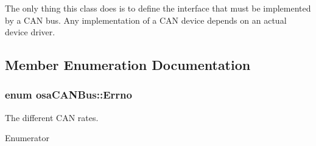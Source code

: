 The only thing this class does is to define the interface that must be implemented by a C\+A\+N bus. Any implementation of a C\+A\+N device depends on an actual device driver. 

\subsection{Member Enumeration Documentation}
\hypertarget{classosa_c_a_n_bus_a6fa3e95ec4c36932d0640e40e0748fde}{}
\subsubsection[{Errno}]{\setlength{\rightskip}{0pt plus 5cm}enum {\bf osa\+C\+A\+N\+Bus\+::\+Errno}}\label{classosa_c_a_n_bus_a6fa3e95ec4c36932d0640e40e0748fde}


The different C\+A\+N rates. 

\begin{Desc}
\item[Enumerator]\par
\begin{description}
\item[{\em 
\hypertarget{classosa_c_a_n_bus_a6fa3e95ec4c36932d0640e40e0748fdeaef10d7d2c42027e99e8b6662a516adef}{}E\+S\+U\+C\+C\+E\+S\+S\label{classosa_c_a_n_bus_a6fa3e95ec4c36932d0640e40e0748fdeaef10d7d2c42027e99e8b6662a516adef}
}]\item[{\em 
\hypertarget{classosa_c_a_n_bus_a6fa3e95ec4c36932d0640e40e0748fdea2bd4b249945acf638e8d93c36b122150}{}E\+F\+A\+I\+L\+U\+R\+E\label{classosa_c_a_n_bus_a6fa3e95ec4c36932d0640e40e0748fdea2bd4b249945acf638e8d93c36b122150}
}]\end{description}
\end{Desc}
\hypertarget{classosa_c_a_n_bus_a74fe35c6059237887431f3ccece7b21b}{}
